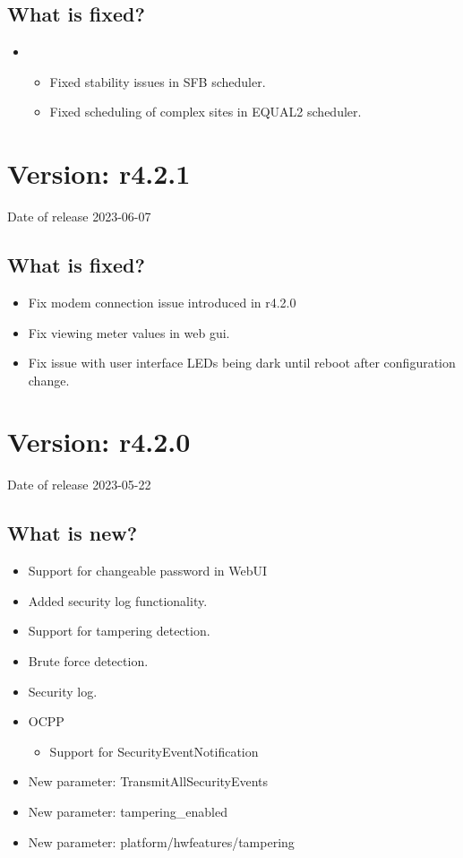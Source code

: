 \documentclass{scrartcl}
\begin{document}
\subsection*{What is fixed?}

\begin{itemize}
    \item \nanogrid\
    \begin{itemize}
        \item Fixed stability issues in SFB scheduler.
        \item Fixed scheduling of complex sites in EQUAL2 scheduler.
    \end{itemize}
\end{itemize}


\section{Version: r4.2.1}
Date of release 2023-06-07

\subsection*{What is fixed?}

\begin{itemize}
  \item Fix modem connection issue introduced in r4.2.0
  \item Fix viewing meter values in web gui.
  \item Fix issue with user interface LEDs being dark until reboot after configuration change.
\end{itemize}


\section{Version: r4.2.0}
Date of release 2023-05-22

\subsection*{What is new?}

\begin{itemize}
\item Support for changeable password in WebUI
\item Added security log functionality.
\item Support for tampering detection.
\item Brute force detection.
\item Security log.
\item OCPP
    \begin{itemize}
    \item Support for SecurityEventNotification
    \end{itemize}
\item New parameter: TransmitAllSecurityEvents
\item New parameter: tampering\_enabled
\item New parameter: platform/hwfeatures/tampering
\end{itemize}
\end{document}
